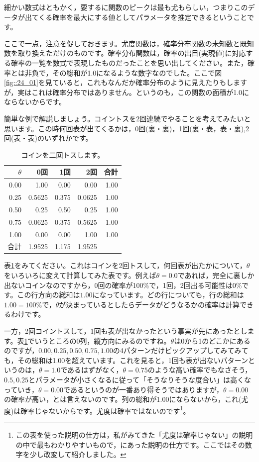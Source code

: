 \documentclass{ltjsarticle}
\begin{document}
細かい数式はともかく，要するに関数のピークは最も尤もらしい，つまりこのデータが出てくる確率を最大にする値としてパラメータを推定できるということです。

ここで一点，注意を促しておきます。尤度関数は，確率分布関数の未知数と既知数を取り換えただけのものです。確率分布関数は，確率の出目(実現値)に対応する確率の一覧を数式で表現したものだったことを思い出してください。また，確率とは非負で，その総和が1.0になるような数字なのでした。ここで図\ref{fig::24_01}を見ていると，これもなんだか確率分布のように見えたりもしますが，実はこれは確率分布ではありません。というのも，この関数の面積が1.0にならないからです。

簡単な例で解説しましょう。コイントスを2回連続でやることを考えてみたいと思います。この時何回表が出てくるかは，0回(裏・裏)，1回(裏・表，表・裏),2回(表・表)のいずれかです。

\begin{table}[ht]
    \centering
    \caption{コインを二回トスします。} 
    \begin{tabular}{rrrrr}
      \hline
    $\theta$  & 0回 & 1回 & 2回 & 合計 \\
    \hline
    0.00 & 1.00 & 0.00 & 0.00 & 1.00\\
    0.25 & 0.5625 & 0.375 & 0.0625 & 1.00\\
    0.50 & 0.25 & 0.50 & 0.25 & 1.00\\
    0.75 & 0.0625 & 0.375 & 0.5625 & 1.00\\
    1.00 & 0.00 & 0.00 & 1.00 & 1.00\\
    \hline
    合計 & 1.9525 & 1.175 & 1.9525 &  \\
    \hline
    \end{tabular}
      \label{tbl::24_01}
\end{table}

表\ref{tbl::24_01}をみてください。これはコインを2回トスして，何回表が出たかについて，$\theta$をいろいろに変えて計算してみた表です。例えば$\theta=0.0$であれば，完全に裏しか出ないコインなのですから，0回の確率が100\%で，1回，2回出る可能性は0\%です。この行方向の総和は$1.00$になっています。どの行についても，行の総和は$1.00=100\%$で，$\theta$が決まっているとしたらデータがどうなるかの確率は計算できるわけです。

一方，2回コイントスして，1回も表が出なかったという事実が先にあったとします。表\ref{tbl::24_01}でいうところの0列，縦方向にみるのですね。$\theta$は0から1のどこかにあるのですが，$0.00,0.25,0.50,0.75,1.00$の4パターンだけピックアップしてみてみても，その総和は1.00を超えています。これを見ると，1回も表が出ないパターンというのは，$\theta=1.0$であるはずがなく，$\theta=0.75$のような高い確率でもなさそう，$0.5,0.25$とパラメータが小さくなるに従って「そうなりそうな度合い」は高くなっていき，$\theta=0.00$であるというのが一番あり得そうではありますが，$\theta=0.00$の確率が高い，とは言えないのです。列の総和が1.00にならないから，これ(尤度)は確率じゃないからです。尤度は確率ではないのです\footnote{この表を使った説明の仕方は，私がみてきた「尤度は確率じゃない」の説明の中で最もわかりやすいもので，\citet{lambert2018student}にあった説明の仕方です。ここではその数字を少し改変して紹介しました。}。
\end{document}
